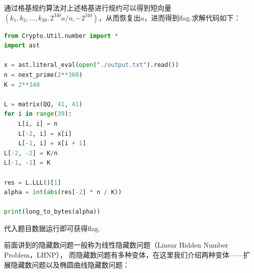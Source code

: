 \documentclass{book}
\numberwithin{equation}{subsubsection}
\begin{document}
通过格基规约算法对上述格基进行规约可以得到短向量$(k_1,k_2,\ldots,k_{39},2^{340}a/n,-2^{340})$，从而恢复出$a$，进而得到flag.求解代码如下：
\begin{lstlisting}[language=Python,basicstyle=\ttfamily,breaklines=true,keywordstyle=\bfseries\color{blue}]
from Crypto.Util.number import *
import ast

x = ast.literal_eval(open("./output.txt").read())
n = next_prime(2**360)
K = 2**340

L = matrix(QQ, 41, 41)
for i in range(39):
    L[i, i] = n
    L[-2, i] = x[i]
    L[-1, i] = x[i + 1]
L[-2, -2] = K/n
L[-1, -1] = K

res = L.LLL()[1]
alpha = int(abs(res[-2] * n / K))

print(long_to_bytes(alpha))
\end{lstlisting}
代入题目数据运行即可获得flag.\par
前面讲到的隐藏数问题一般称为线性隐藏数问题（Linear Hidden Number Problem，LHNP），
而隐藏数问题有多种变体，在这里我们介绍两种变体——扩展隐藏数问题以及椭圆曲线隐藏数问题：
\end{document}
